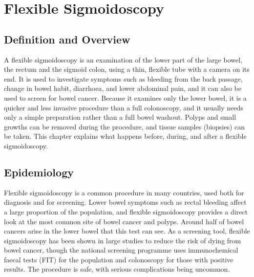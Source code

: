 \chapter{Flexible Sigmoidoscopy}

\section*{Definition and Overview}
A flexible sigmoidoscopy is an examination of the lower part of the large bowel, the rectum and the sigmoid colon, using a thin, flexible tube with a camera on its end. It is used to investigate symptoms such as bleeding from the back passage, change in bowel habit, diarrhoea, and lower abdominal pain, and it can also be used to screen for bowel cancer. Because it examines only the lower bowel, it is a quicker and less invasive procedure than a full colonoscopy, and it usually needs only a simple preparation rather than a full bowel washout. Polyps and small growths can be removed during the procedure, and tissue samples (biopsies) can be taken. This chapter explains what happens before, during, and after a flexible sigmoidoscopy.

\section*{Epidemiology}
Flexible sigmoidoscopy is a common procedure in many countries, used both for diagnosis and for screening. Lower bowel symptoms such as rectal bleeding affect a large proportion of the population, and flexible sigmoidoscopy provides a direct look at the most common site of bowel cancer and polyps. Around half of bowel cancers arise in the lower bowel that this test can see. As a screening tool, flexible sigmoidoscopy has been shown in large studies to reduce the risk of dying from bowel cancer, though the national screening programme uses immunochemical faecal tests (FIT) for the population and colonoscopy for those with positive results. The procedure is safe, with serious complications being uncommon.

